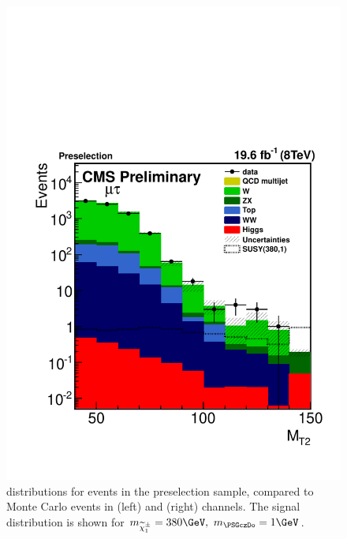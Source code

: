 \begin{figure}[!htb]
\includegraphics[angle=0,scale=0.375]{SelectionMuTau/MT2_mutau.pdf}
\caption{\mttwo  distributions for events in the preselection sample, compared to Monte Carlo events in (left) \eTau and (right) \muTau channels. The signal distribution is shown for $m_{\chione}=380\GeV,~m_{\PSGczDo}=1\GeV$.}
\label{fig:mt2leptontau}
\end{figure}

